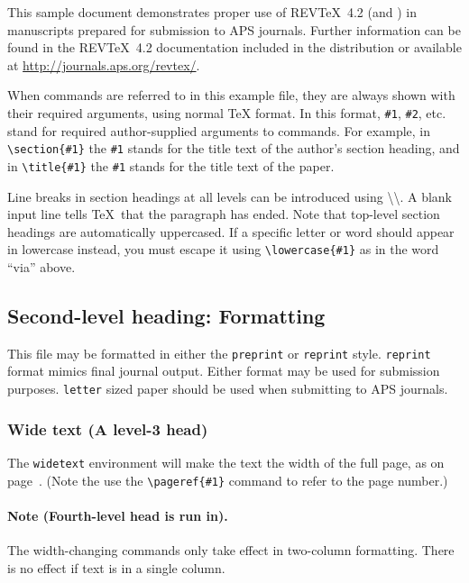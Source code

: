 \documentclass[%
 preprint, linenumbers,
 amsmath,amssymb,
 aps, physrev,
]{revtex4-2}
\begin{document}
This sample document demonstrates proper use of REV\TeX~4.2 (and
\LaTeXe) in manuscripts prepared for submission to APS
journals. Further information can be found in the REV\TeX~4.2
documentation included in the distribution or available at
\url{http://journals.aps.org/revtex/}.

When commands are referred to in this example file, they are always
shown with their required arguments, using normal \TeX{} format. In
this format, \verb+#1+, \verb+#2+, etc. stand for required
author-supplied arguments to commands. For example, in
\verb+\section{#1}+ the \verb+#1+ stands for the title text of the
author's section heading, and in \verb+\title{#1}+ the \verb+#1+
stands for the title text of the paper.

Line breaks in section headings at all levels can be introduced using
\textbackslash\textbackslash. A blank input line tells \TeX\ that the
paragraph has ended. Note that top-level section headings are
automatically uppercased. If a specific letter or word should appear in
lowercase instead, you must escape it using \verb+\lowercase{#1}+ as
in the word ``via'' above.

\subsection{\label{sec:level2}Second-level heading: Formatting}

This file may be formatted in either the \texttt{preprint} or
\texttt{reprint} style. \texttt{reprint} format mimics final journal output. 
Either format may be used for submission purposes. \texttt{letter} sized paper should
be used when submitting to APS journals.

\subsubsection{\textbf{Wide text (A level-3 head)}}
The \texttt{widetext} environment will make the text the width of the
full page, as on page~\pageref{eq:wideeq}. (Note the use the
\verb+\pageref{#1}+ command to refer to the page number.) 
\paragraph{Note (Fourth-level head is run in).}
The width-changing commands only take effect in two-column formatting. 
There is no effect if text is in a single column.
\end{document}
